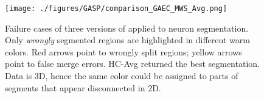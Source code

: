 





\begin{figure}
\centering
\texttt{[image: ./figures/GASP/comparison\_GAEC\_MWS\_Avg.png]} %
\caption{Failure cases of three versions of \algname{} applied to neuron segmentation. Only \emph{wrongly} segmented regions are highlighted in different warm colors. Red arrows point to wrongly split regions; yellow arrows point to false merge errors. HC-Avg returned the best segmentation. Data is 3D, hence the same color could be assigned to parts of segments that appear disconnected in 2D.  
\label{fig:failure_cases}}
\end{figure}









